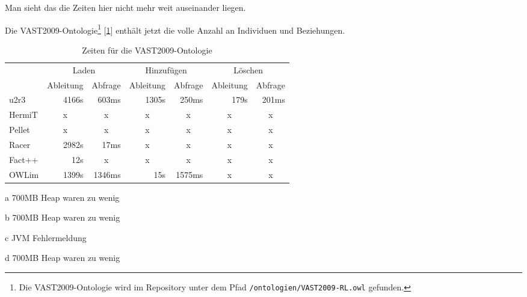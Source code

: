 Man sieht das die Zeiten hier nicht mehr weit auseinander liegen.

Die VAST2009-Ontologie\footnote{Die VAST2009-Ontologie wird im Repository unter dem Pfad \texttt{/ontologien/VAST2009-RL.owl} gefunden.} [\ref{table-time-vast2009}] enthält jetzt die volle Anzahl an Individuen und Beziehungen.

\begin{table}[htbp]
\caption{Zeiten für die VAST2009-Ontologie}
\label{table-time-vast2009}
\begin{center}
\begin{threeparttable}
\begin{tabular}{l|r|r|r|r|r|r|}
\cline{2-7}
 & \multicolumn{2}{|c|}{Laden} & \multicolumn{2}{|c|}{Hinzufügen} & \multicolumn{2}{|c|}{Löschen} \\
\cline{2-7}
 & \multicolumn{1}{|c|}{Ableitung} & \multicolumn{1}{|c|}{Abfrage} & \multicolumn{1}{|c|}{Ableitung} & \multicolumn{1}{|c|}{Abfrage} & \multicolumn{1}{|c|}{Ableitung} & \multicolumn{1}{|c|}{Abfrage} \\
\hline
\multicolumn{1}{|l|}{u2r3} & 4166s & 603ms & 1305s & 250ms & 179s & 201ms \\ \hline
\multicolumn{1}{|l|}{HermiT\tnote{a}} & \multicolumn{1}{c|}{x} & \multicolumn{1}{c|}{x} & \multicolumn{1}{c|}{x} & \multicolumn{1}{c|}{x} & \multicolumn{1}{c|}{x} & \multicolumn{1}{c|}{x} \\ \hline
\multicolumn{1}{|l|}{Pellet\tnote{b}} & \multicolumn{1}{c|}{x} & \multicolumn{1}{c|}{x} & \multicolumn{1}{c|}{x} & \multicolumn{1}{c|}{x} & \multicolumn{1}{c|}{x} & \multicolumn{1}{c|}{x} \\ \hline
\multicolumn{1}{|l|}{Racer\tnote{c}} & 2982s & 17ms & \multicolumn{1}{c|}{x} & \multicolumn{1}{c|}{x} & \multicolumn{1}{c|}{x} & \multicolumn{1}{c|}{x} \\ \hline
\multicolumn{1}{|l|}{Fact++\tnote{d}} & 12s & \multicolumn{1}{c|}{x} & \multicolumn{1}{c|}{x} & \multicolumn{1}{c|}{x} & \multicolumn{1}{c|}{x} & \multicolumn{1}{c|}{x} \\ \hline
\multicolumn{1}{|l|}{OWLim} & 1399s & 1346ms & 15s & 1575ms & \multicolumn{1}{c|}{x} & \multicolumn{1}{c|}{x} \\ \hline
\end{tabular}
\begin{tablenotes}
	\item[a] 700MB Heap waren zu wenig
	\item[b] 700MB Heap waren zu wenig
	\item[c] JVM Fehlermeldung
	\item[d] 700MB Heap waren zu wenig
\end{tablenotes}
\end{threeparttable}
\end{center}
\end{table}

